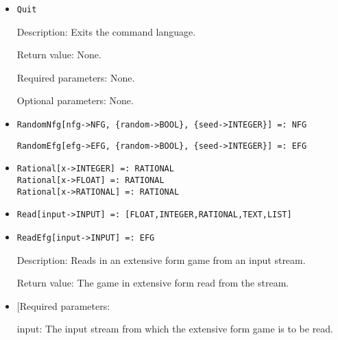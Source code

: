 \begin{itemize}


\item
\protect \large \begin{verbatim}
Quit
\end{verbatim}\normalsize

\bd

\item
[Description:] Exits the command language.
\item
[Return value:] None.
\item
[Required parameters:] None.
\item
[Optional parameters:] None.
\ed


\item
\protect \large \begin{verbatim}
RandomNfg[nfg->NFG, {random->BOOL}, {seed->INTEGER}] =: NFG
\end{verbatim}\normalsize
\protect \large \begin{verbatim}
RandomEfg[efg->EFG, {random->BOOL}, {seed->INTEGER}] =: EFG
\end{verbatim}\normalsize

\item
\protect \large \begin{verbatim}
Rational[x->INTEGER] =: RATIONAL
Rational[x->FLOAT] =: RATIONAL
Rational[x->RATIONAL] =: RATIONAL
\end{verbatim} \normalsize


\item
\protect \large \begin{verbatim}
Read[input->INPUT] =: [FLOAT,INTEGER,RATIONAL,TEXT,LIST]
\end{verbatim}\normalsize

\item
\protect \large \begin{verbatim}
ReadEfg[input->INPUT] =: EFG
\end{verbatim}\normalsize

\bd
\item
[Description:] Reads in an extensive form game from an input stream.  
\item
[Return value:] The game in extensive form read from the stream.
\item

[Required parameters:

\bd
\item
[input:] The input stream from which the extensive form game is to be
read. 
\ed


\end{itemize}
